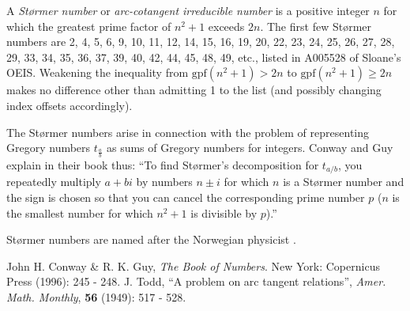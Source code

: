 \documentclass[12pt]{article}
\newcommand{\gpf}{\textrm{gpf}}
\begin{document}
A {\em St{\o}rmer number} or {\em arc-cotangent irreducible number} is a positive integer $n$ for which the greatest prime factor of $n^2 + 1$ exceeds $2n$. The first few St{\o}rmer numbers are 2, 4, 5, 6, 9, 10, 11, 12, 14, 15, 16, 19, 20, 22, 23, 24, 25, 26, 27, 28, 29, 33, 34, 35, 36, 37, 39, 40, 42, 44, 45, 48, 49, etc., listed in A005528 of Sloane's OEIS. Weakening the inequality from $\gpf(n^2 + 1) > 2n$ to $\gpf(n^2 + 1) \geq 2n$ makes no difference other than admitting 1 to the list (and possibly changing index offsets accordingly).

The St{\o}rmer numbers arise in connection with the problem of representing Gregory numbers $t_{\frac{a}{b}}$ as sums of Gregory numbers for integers. Conway and Guy explain in their book thus: ``To find St{\o}rmer's decomposition for $t_{a / b}$, you repeatedly multiply $a + bi$ by numbers $n \pm i$ for which $n$ is a St{\o}rmer number and the sign is chosen so that you can cancel the corresponding prime number $p$ ($n$ is the smallest number for which $n^2 + 1$ is divisible by $p$).''

St{\o}rmer numbers are named after the Norwegian physicist .

\begin{thebibliography}{2}
 John H. Conway \& R. K. Guy, {\it The Book of Numbers}. New York: Copernicus Press (1996): 245 - 248. 
 J. Todd, ``A problem on arc tangent relations'', {\it Amer. Math. Monthly}, {\bf 56} (1949): 517 - 528.
\end{thebibliography}
\end{document}

